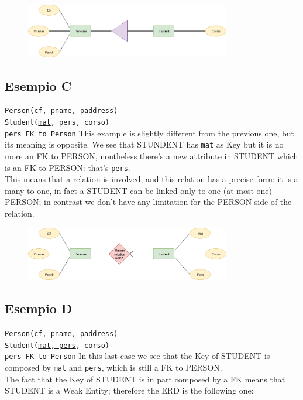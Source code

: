 \documentclass[12pt, oneside]{report}
\newcommand\tab[1][1cm]{\hspace*{#1}}
\begin{document}
\begin{figure}[H]
	\centering
	\includegraphics[width=0.8\textwidth,keepaspectratio]{diagram6_01.png}
	\label{diagram6_01}
\end{figure}

\subsection*{Esempio C}
\texttt{Person(\underline{cf}, pname, paddress)}\\
\texttt{Student(\underline{mat}, pers, corso)}\\
\tab[.4cm] \texttt{pers FK to Person}
\vskip 8pt
This example is slightly different from the previous one, but its meaning is opposite. We see that STUNDENT has \texttt{mat} as Key but it is no more an FK to PERSON, nontheless there's a new attribute in STUDENT which is an FK to PERSON: that's \texttt{pers}.\\
This means that a relation is involved, and this relation has a precise form: it is a many to one, in fact a STUDENT can be linked only to one (at most one) PERSON; in contrast we don't have any limitation for the PERSON side of the relation.

\begin{figure}[H]
	\centering
	\includegraphics[width=0.8\textwidth,keepaspectratio]{diagram6_02.png}
	\label{diagram6_02}
\end{figure}

\subsection*{Esempio D}
\texttt{Person(\underline{cf}, pname, paddress)}\\
\texttt{Student(\underline{mat, pers}, corso)}\\
\tab[.4cm] \texttt{pers FK to Person}
\vskip 8pt
In this last case we see that the Key of STUDENT is composed by \texttt{mat} and \texttt{pers}, which is still a FK to PERSON.\\
The fact that the Key of STUDENT is in part composed by a FK means that STUDENT is a Weak Entity; therefore the ERD is the following one:
\end{document}
